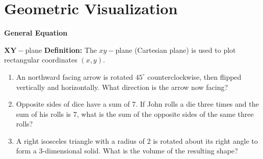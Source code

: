 \section{Geometric Visualization}

\textbf{General Equation}

\bigskip
\begin{equationbox}{$\boldsymbol{XY-}$plane}
\textbf{Definition:} The $xy-$plane (Cartesian plane) is used to plot rectangular coordinates $(x, y)$.

\begin{center}
\end{center}
\end{equationbox}

\bigskip
\begin{enumerate}[labelindent=*,style=multiline,leftmargin=*,label=\textbf{Example \arabic*:}]
\item An northward facing arrow is rotated $45^\circ$ counterclockwise, then flipped vertically and horizontally. What direction is the arrow now facing?
\vfill\item Opposite sides of dice have a sum of 7. If John rolls a die three times and the sum of his rolls is 7, what is the sum of the opposite sides of the same three rolls?
\vfill\item A right isosceles triangle with a radius of 2 is rotated about its right angle to form a 3-dimensional solid. What is the volume of the resulting shape?
\end{enumerate}

